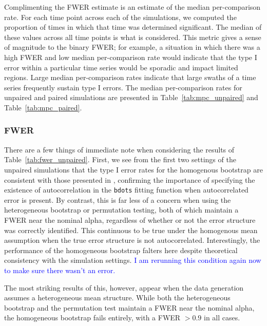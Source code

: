 \documentclass{article}
\newcommand{\xt}{\texttt}
\providecommand{\cn}[1]{\textcolor{blue}{#1}}
\begin{document}
Complimenting the FWER estimate is an estimate of the median per-comparison rate. For each time point across each of the simulations, we computed the proportion of times in which that time was determined significant. The median of these values across all time points is what is considered. This metric gives a sense of magnitude to the binary FWER; for example, a situation in which there was a high FWER and low median per-comparison rate would indicate that the type I error within a particular time series would be sporadic and impact limited regions. Large median per-comparison rates indicate that large swaths of a time series frequently sustain type I errors. The median per-comparison rates for unpaired and paired simulations are presented in Table~\ref{tab:mpc_unpaired} and Table~\ref{tab:mpc_paired}.


\subsubsection{FWER}



There are a few things of immediate note when considering the results of Table~\ref{tab:fwer_unpaired}. First, we see from the first two settings of the unpaired simulations that the type I error rates for the homogenous bootstrap are consistent with those presented in \cite{oleson2017detecting}, confirming the importance of specifying the existence of autocorrelation in the \xt{bdots} fitting function when autocorrelated error is present. By contrast, this is far less of a concern when using the heterogeneous bootstrap or permutation testing, both of which maintain a FWER near the nominal alpha, regardless of whether or not the error structure was correctly identified. This continuous to be true under the homogenous mean assumption when the true error structure is not autocorrelated. Interestingly, the performance of the homogeneous bootstrap falters here despite theoretical consistency with the simulation settings. \cn{I am rerunning this condition again now to make sure there wasn't an error.}

The most striking results of this, however, appear when the data generation assumes a heterogeneous mean structure. While both the heterogeneous bootstrap and the permutation test maintain a FWER near the nominal alpha, the homogeneous bootstrap fails entirely, with a FWER $> 0.9$ in all cases.
\end{document}
